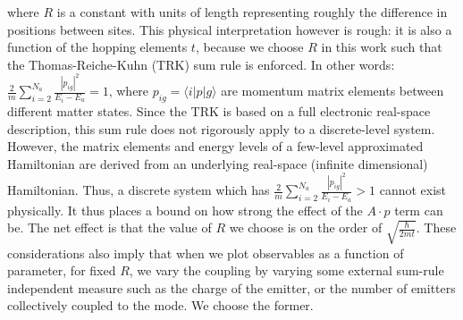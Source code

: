 \documentclass[aps,prl,twocolumn,
	groupedaddress,superscriptaddress,
	amsfonts,amssymb,amsmath,floatfix,
	citeautoscript]{revtex4-1}
\begin{document}
where $R$ is a constant with units of length representing roughly the difference in positions between sites. This physical interpretation however is rough: it is also a function of the hopping elements $t$, because we choose $R$ in this work such that the Thomas-Reiche-Kuhn (TRK) sum rule is enforced. In other words: $\frac{2}{m}\sum\limits_{i=2}^{N_a}\frac{|p_{ig}|^2}{E_i - E_a} = 1$, where $p_{ig} = \langle i|p|g\rangle$ are momentum matrix elements between different matter states.  Since the TRK is based on a full electronic real-space description, this sum rule does not rigorously apply to a discrete-level system. However, the matrix elements and energy levels of a few-level approximated Hamiltonian  are derived from an underlying real-space (infinite dimensional) Hamiltonian. Thus, a discrete system which has  $\frac{2}{m}\sum\limits_{i=2}^{N_a}\frac{|p_{ig}|^2}{E_i - E_a} > 1$ cannot exist physically. It thus places a bound on how strong the effect of the $A\cdot p$ term can be. The net effect is that the value of $R$ we choose is on the order of $\sqrt{\frac{\hbar}{2mt}}$. These considerations also imply that when we plot observables as a function of parameter, for fixed $R$, we vary the coupling by varying some external sum-rule independent measure such as the charge of the emitter, or the number of emitters collectively coupled to the mode. We choose the former.
\end{document}
